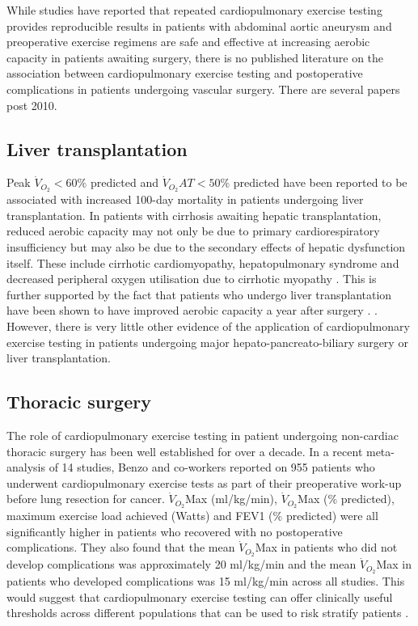 While studies have reported that repeated cardiopulmonary exercise testing provides reproducible results in patients with abdominal aortic aneurysm and preoperative exercise regimens are safe and effective at increasing aerobic capacity in patients awaiting surgery, there is no published literature on the association between cardiopulmonary exercise testing and postoperative complications in patients undergoing vascular surgery. %
There are several papers post 2010. 

\subsection{Liver transplantation}
Peak $\dot{V}_{O_2}<60\%$ predicted and $\dot{V}_{O_2}AT<50\%$ predicted have been reported to be associated with increased 100-day mortality in patients undergoing liver transplantation. 
In patients with cirrhosis awaiting hepatic transplantation, reduced aerobic capacity may not only be due to primary cardiorespiratory insufficiency but may also be due to the secondary effects of hepatic dysfunction itself. 
These include cirrhotic cardiomyopathy, hepatopulmonary syndrome and decreased peripheral oxygen utilisation due to cirrhotic myopathy \parencite{epstein_aerobic_2004}. 
This is further supported by the fact that patients who undergo liver transplantation have been shown to have improved aerobic capacity a year after surgery \parencite{iscar_functional_2009}. . 
However, there is very little other evidence of the application of cardiopulmonary exercise testing in patients undergoing major hepato-pancreato-biliary surgery or liver transplantation.

\subsection{Thoracic surgery}
The role of cardiopulmonary exercise testing in patient undergoing non-cardiac thoracic surgery has been well established for over a decade. 
In a recent meta-analysis of 14 studies, Benzo and co-workers reported on 955 patients who underwent cardiopulmonary exercise tests as part of their preoperative work-up before lung resection for cancer. $\dot{V}_{O_2}$Max (ml/kg/min), $\dot{V}_{O_2}$Max (\% predicted), maximum exercise load achieved (Watts) and FEV1 (\% predicted) were all significantly higher in patients who recovered with no postoperative complications. 
They also found that the mean $\dot{V}_{O_2}$Max in patients who did not develop complications was approximately 20 ml/kg/min and the mean $\dot{V}_{O_2}$Max in patients who developed complications was 15 ml/kg/min across all studies. 
This would suggest that cardiopulmonary exercise testing can offer clinically useful thresholds across different populations that can be used to risk stratify patients \parencite{benzo_complications_2007}. 

